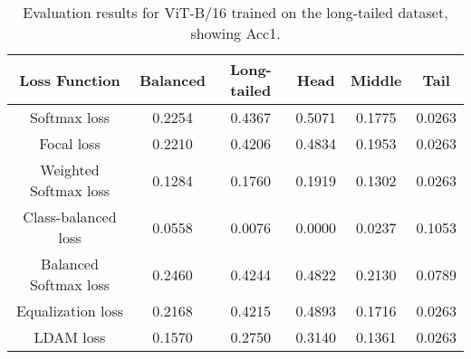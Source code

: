 \begin{table}[H]
    \centering
    \begin{tabular}{cccccc}
        \toprule
        Loss Function & Balanced & Long-tailed & Head & Middle & Tail \\ 
        \midrule
        Softmax loss   & 0.2254 & 0.4367 & 0.5071 & 0.1775 & 0.0263 \\
        Focal loss   & 0.2210 & 0.4206 & 0.4834 & 0.1953 & 0.0263 \\
        Weighted Softmax loss   & 0.1284 & 0.1760 & 0.1919 & 0.1302 & 0.0263 \\
        Class-balanced loss   & 0.0558 & 0.0076 & 0.0000 & 0.0237 & 0.1053 \\
        Balanced Softmax loss   & 0.2460 & 0.4244 & 0.4822 &  0.2130 & 0.0789 \\
        Equalization loss   & 0.2168 & 0.4215 & 0.4893 & 0.1716 & 0.0263 \\
        LDAM loss   & 0.1570 & 0.2750 & 0.3140 & 0.1361 & 0.0263 \\
        \bottomrule
    \end{tabular}
    \caption{Evaluation results for ViT-B/16 trained on the long-tailed dataset, showing Acc1.}
    \label{tab:vil_lt_acc1}
\end{table}


